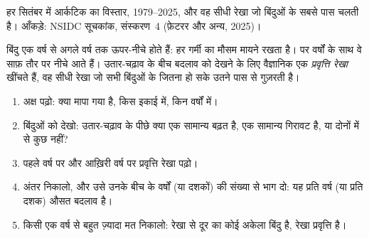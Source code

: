 \begin{omfigure}

{\small हर सितंबर में आर्कटिक  का विस्तार, 1979--2025, और वह सीधी रेखा जो
बिंदुओं के सबसे पास चलती है। आँकड़े: NSIDC  सूचकांक, संस्करण~4 (फ़ेटरर
और अन्य, 2025)।}
\label{fig:g8:ice-on-earth:sea-ice}
\end{omfigure}

बिंदु एक वर्ष से अगले वर्ष तक ऊपर-नीचे होते हैं: हर गर्मी का मौसम मायने रखता है। पर वर्षों
के साथ वे साफ़ तौर पर नीचे आते हैं। उतार-चढ़ाव के बीच बदलाव को देखने के लिए वैज्ञानिक एक
\emph{प्रवृत्ति रेखा} खींचते हैं, वह सीधी रेखा जो सभी बिंदुओं के जितना हो सके उतने पास
से गुज़रती है।

\begin{method}[ग्राफ़ पर प्रवृत्ति पढ़ना]
\begin{enumerate}
  \item अक्ष पढ़ो: क्या मापा गया है, किस इकाई में, किन वर्षों में।
  \item बिंदुओं को देखो: उतार-चढ़ाव के पीछे क्या एक सामान्य बढ़त है, एक सामान्य
        गिरावट है, या दोनों में से कुछ नहीं?
  \item पहले वर्ष पर और आख़िरी वर्ष पर प्रवृत्ति रेखा पढ़ो।
  \item अंतर निकालो, और उसे उनके बीच के वर्षों (या दशकों) की संख्या से भाग दो: यह प्रति
        वर्ष (या प्रति दशक) औसत बदलाव
        है।
  \item किसी एक वर्ष से बहुत ज़्यादा मत निकालो: रेखा से दूर का कोई अकेला बिंदु  है,
        रेखा प्रवृत्ति है।
\end{enumerate}
\end{method}

